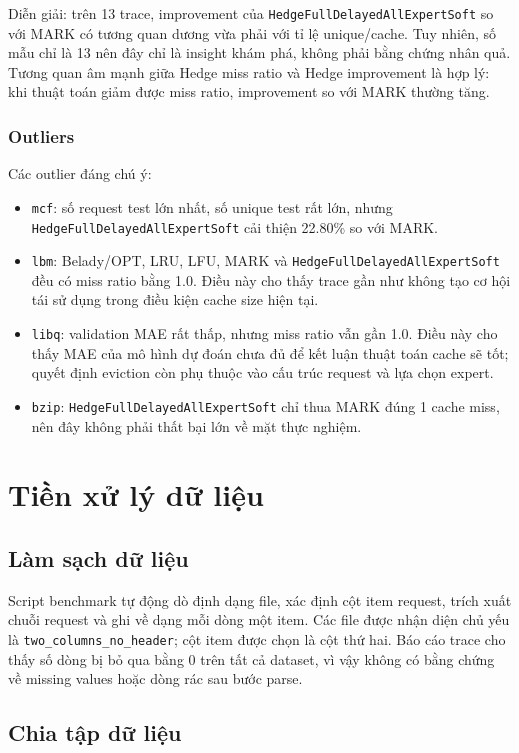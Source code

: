 \documentclass[11pt,a4paper]{article}
\newcommand{\code}[1]{\texttt{#1}}
\newcommand{\hedge}{\code{HedgeFullDelayedAllExpertSoft}}
\begin{document}
Diễn giải: trên 13 trace, improvement của \hedge{} so với MARK có tương quan dương vừa phải với tỉ lệ unique/cache. Tuy nhiên, số mẫu chỉ là 13 nên đây chỉ là insight khám phá, không phải bằng chứng nhân quả. Tương quan âm mạnh giữa Hedge miss ratio và Hedge improvement là hợp lý: khi thuật toán giảm được miss ratio, improvement so với MARK thường tăng.

\subsubsection{Outliers}

Các outlier đáng chú ý:

\begin{itemize}[leftmargin=1.4em]
    \item \code{mcf}: số request test lớn nhất, số unique test rất lớn, nhưng \hedge{} cải thiện 22.80\% so với MARK.
    \item \code{lbm}: Belady/OPT, LRU, LFU, MARK và \hedge{} đều có miss ratio bằng 1.0. Điều này cho thấy trace gần như không tạo cơ hội tái sử dụng trong điều kiện cache size hiện tại.
    \item \code{libq}: validation MAE rất thấp, nhưng miss ratio vẫn gần 1.0. Điều này cho thấy MAE của mô hình dự đoán chưa đủ để kết luận thuật toán cache sẽ tốt; quyết định eviction còn phụ thuộc vào cấu trúc request và lựa chọn expert.
    \item \code{bzip}: \hedge{} chỉ thua MARK đúng 1 cache miss, nên đây không phải thất bại lớn về mặt thực nghiệm.
\end{itemize}

\section{Tiền xử lý dữ liệu}

\subsection{Làm sạch dữ liệu}

Script benchmark tự động dò định dạng file, xác định cột item request, trích xuất chuỗi request và ghi về dạng mỗi dòng một item. Các file được nhận diện chủ yếu là \code{two\_columns\_no\_header}; cột item được chọn là cột thứ hai. Báo cáo trace cho thấy số dòng bị bỏ qua bằng 0 trên tất cả dataset, vì vậy không có bằng chứng về missing values hoặc dòng rác sau bước parse.

\subsection{Chia tập dữ liệu}
\end{document}
